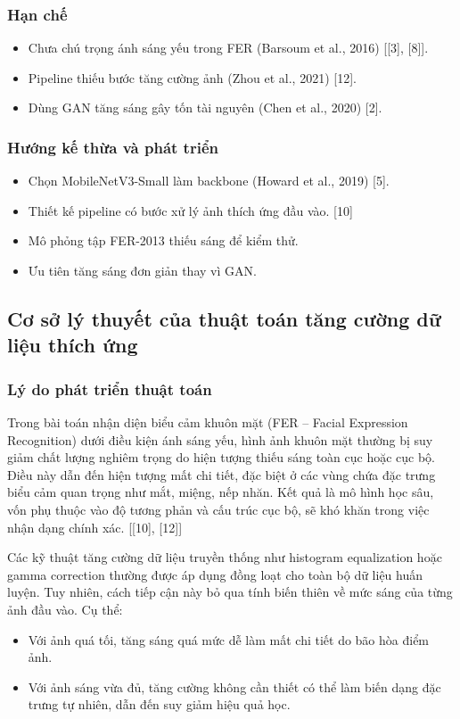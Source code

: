 \subsubsection{Hạn chế}
\begin{itemize}
    \item Chưa chú trọng ánh sáng yếu trong FER (Barsoum et al., 2016) [[3], [8]].
    \item Pipeline thiếu bước tăng cường ảnh (Zhou et al., 2021) [12].
    \item Dùng GAN tăng sáng gây tốn tài nguyên (Chen et al., 2020) [2].
\end{itemize}

\subsubsection{Hướng kế thừa và phát triển}
\begin{itemize}
    \item Chọn MobileNetV3-Small làm backbone (Howard et al., 2019) [5].
    \item Thiết kế pipeline có bước xử lý ảnh thích ứng đầu vào. [10]
    \item Mô phỏng tập FER-2013 thiếu sáng để kiểm thử.
    \item Ưu tiên tăng sáng đơn giản thay vì GAN.
\end{itemize}

\subsection{Cơ sở lý thuyết của thuật toán tăng cường dữ liệu thích ứng} %

\subsubsection{Lý do phát triển thuật toán} %
Trong bài toán nhận diện biểu cảm khuôn mặt (FER -- Facial Expression Recognition) dưới điều kiện ánh sáng yếu, hình ảnh khuôn mặt thường bị suy giảm chất lượng nghiêm trọng do hiện tượng thiếu sáng toàn cục hoặc cục bộ. Điều này dẫn đến hiện tượng mất chi tiết, đặc biệt ở các vùng chứa đặc trưng biểu cảm quan trọng như mắt, miệng, nếp nhăn. Kết quả là mô hình học sâu, vốn phụ thuộc vào độ tương phản và cấu trúc cục bộ, sẽ khó khăn trong việc nhận dạng chính xác. [[10], [12]]

Các kỹ thuật tăng cường dữ liệu truyền thống như histogram equalization hoặc gamma correction thường được áp dụng đồng loạt cho toàn bộ dữ liệu huấn luyện. Tuy nhiên, cách tiếp cận này bỏ qua tính biến thiên về mức sáng của từng ảnh đầu vào. Cụ thể:
\begin{itemize}[]
    \item Với ảnh quá tối, tăng sáng quá mức dễ làm mất chi tiết do bão hòa điểm ảnh.
    \item Với ảnh sáng vừa đủ, tăng cường không cần thiết có thể làm biến dạng đặc trưng tự nhiên, dẫn đến suy giảm hiệu quả học.
\end{itemize}

